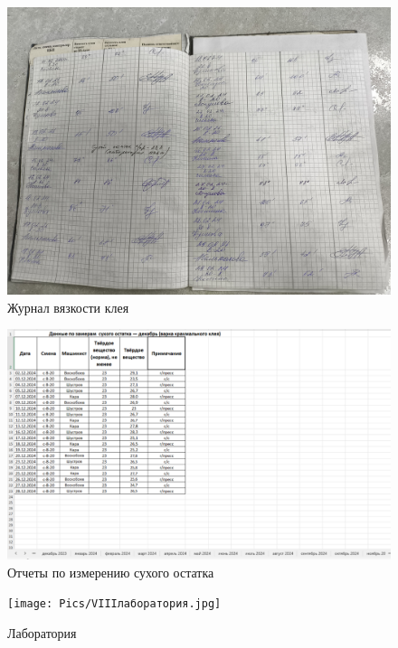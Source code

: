 \begin{figure}
\begin{center}
 \includegraphics[height=0.45\textheight, keepaspectratio]{Pics/VIII журнал клея.jpg}
\end{center}
 \caption{Журнал вязкости клея}
 \label{pic:/VIII журнал клея}
\end{figure}

\begin{figure}
\begin{center}
 \includegraphics[height=0.4\textheight, keepaspectratio]{Pics/VIIIсухойостаток.png}
\end{center}
 \caption{Отчеты по измерению сухого остатка}
 \label{pic:/VIIIсухойостаток}
\end{figure}

\begin{figure}
\begin{center}
 \texttt{[image: Pics/VIIIлаборатория.jpg]}
\end{center}
 \caption{Лаборатория}
 \label{pic:/VIIIлаборатория}
\end{figure}


